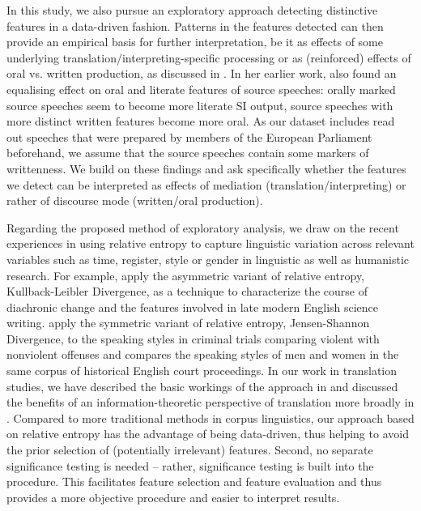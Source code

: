 \documentclass[output=paper,colorlinks,citecolor=brown]{langscibook}
\begin{document}
In this study, we also pursue an exploratory approach detecting distinctive features in a data-driven fashion. Patterns in the features detected can then provide an empirical basis for further interpretation, be it as effects of some underlying translation/interpreting-specific processing or as (reinforced) effects of oral vs. written production, as discussed in \citet{ShlesingerOrdan2012}. In her earlier work, \citet{Shlesinger1989} also found an equalising effect on oral and literate features of source speeches: orally marked source speeches seem to become more literate SI output, source speeches with more distinct written features become more oral. As our dataset includes read out speeches that were prepared by members of the European Parliament beforehand, we assume that the source speeches contain some markers of writtenness. We build on these findings and ask specifically whether the features we detect can be interpreted as effects of mediation (translation/interpreting) or rather of discourse mode (written/oral production).

Regarding the proposed method of exploratory analysis, we draw on the recent experiences in using relative entropy to capture linguistic variation across relevant variables such as time, register, style or gender in linguistic as well as humanistic research. For example, \citet{DegaetanoOrtliebTeich2019} apply the asymmetric variant of relative entropy, Kullback-Leibler Divergence, as a technique to characterize the course of diachronic change and the features involved in late modern English science writing. \citet{KlingensteinEtAl2014} apply the symmetric variant of relative entropy, Jensen-Shannon Divergence, to the speaking styles in criminal trials comparing violent with nonviolent offenses and \citet{DegaetanoOrtlieb2018} compares the speaking styles of men and women in the same corpus of historical English court proceedings. In our work in translation studies, we have described the basic workings of the approach in \citet{Karakantaforthcoming} and discussed the benefits of an information-theoretic perspective of translation more broadly in \citet{TeichEtAl2020}. Compared to more traditional methods in corpus linguistics, our approach based on relative entropy has the advantage of being data-driven, thus helping to avoid the prior selection of (potentially irrelevant) features. Second, no separate significance testing is needed -- rather, significance testing is built into the procedure. This facilitates feature selection and feature evaluation and thus provides a more objective procedure and easier to interpret results.
\end{document}
